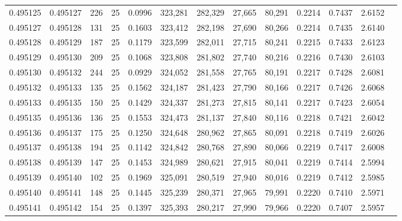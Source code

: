 \begin{tabular}{rrrrrrrrrrrrr}
0.495125 & 0.495127 &   226 &  25 &                                     0.0996 & 323,281 & 282,329 &  27,665 &  80,291 & 0.2214 & 0.7437 & 2.6152 \\
0.495127 & 0.495128 &   131 &  25 &                                     0.1603 & 323,412 & 282,198 &  27,690 &  80,266 & 0.2214 & 0.7435 & 2.6140 \\
0.495128 & 0.495129 &   187 &  25 &                                     0.1179 & 323,599 & 282,011 &  27,715 &  80,241 & 0.2215 & 0.7433 & 2.6123 \\
0.495129 & 0.495130 &   209 &  25 &                                     0.1068 & 323,808 & 281,802 &  27,740 &  80,216 & 0.2216 & 0.7430 & 2.6103 \\
0.495130 & 0.495132 &   244 &  25 &                                     0.0929 & 324,052 & 281,558 &  27,765 &  80,191 & 0.2217 & 0.7428 & 2.6081 \\
0.495132 & 0.495133 &   135 &  25 &                                     0.1562 & 324,187 & 281,423 &  27,790 &  80,166 & 0.2217 & 0.7426 & 2.6068 \\
0.495133 & 0.495135 &   150 &  25 &                                     0.1429 & 324,337 & 281,273 &  27,815 &  80,141 & 0.2217 & 0.7423 & 2.6054 \\
0.495135 & 0.495136 &   136 &  25 &                                     0.1553 & 324,473 & 281,137 &  27,840 &  80,116 & 0.2218 & 0.7421 & 2.6042 \\
0.495136 & 0.495137 &   175 &  25 &                                     0.1250 & 324,648 & 280,962 &  27,865 &  80,091 & 0.2218 & 0.7419 & 2.6026 \\
0.495137 & 0.495138 &   194 &  25 &                                     0.1142 & 324,842 & 280,768 &  27,890 &  80,066 & 0.2219 & 0.7417 & 2.6008 \\
0.495138 & 0.495139 &   147 &  25 &                                     0.1453 & 324,989 & 280,621 &  27,915 &  80,041 & 0.2219 & 0.7414 & 2.5994 \\
0.495139 & 0.495140 &   102 &  25 &                                     0.1969 & 325,091 & 280,519 &  27,940 &  80,016 & 0.2219 & 0.7412 & 2.5985 \\
0.495140 & 0.495141 &   148 &  25 &                                     0.1445 & 325,239 & 280,371 &  27,965 &  79,991 & 0.2220 & 0.7410 & 2.5971 \\
0.495141 & 0.495142 &   154 &  25 &                                     0.1397 & 325,393 & 280,217 &  27,990 &  79,966 & 0.2220 & 0.7407 & 2.5957 \\

\end{tabular}
